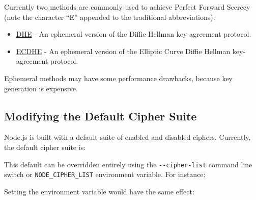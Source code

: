 Currently two methods are commonly used to achieve Perfect Forward
Secrecy (note the character ``E'' appended to the traditional
abbreviations):

\begin{itemize}
\itemsep1pt\parskip0pt
\item
  \href{https://en.wikipedia.org/wiki/Diffie\%E2\%80\%93Hellman_key_exchange}{DHE}
  - An ephemeral version of the Diffie Hellman key-agreement protocol.
\item
  \href{https://en.wikipedia.org/wiki/Elliptic_curve_Diffie\%E2\%80\%93Hellman}{ECDHE}
  - An ephemeral version of the Elliptic Curve Diffie Hellman
  key-agreement protocol.
\end{itemize}

Ephemeral methods may have some performance drawbacks, because key
generation is expensive.

\subsection{Modifying the Default Cipher
Suite}\label{modifying-the-default-cipher-suite}

Node.js is built with a default suite of enabled and disabled ciphers.
Currently, the default cipher suite is:

\begin{Shaded}
\begin{Highlighting}[]
\end{Highlighting}
\end{Shaded}

This default can be overridden entirely using the
\texttt{-\/-cipher-list} command line switch or
\texttt{NODE\_CIPHER\_LIST} environment variable. For instance:

\begin{Shaded}
\begin{Highlighting}[]
\end{Highlighting}
\end{Shaded}

Setting the environment variable would have the same effect:

\begin{Shaded}
\begin{Highlighting}[]
\end{Highlighting}
\end{Shaded}

